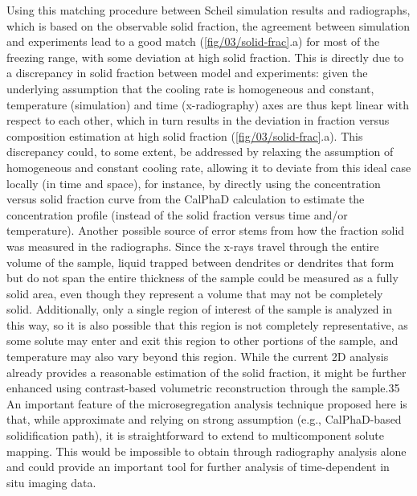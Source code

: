 Using this matching procedure between Scheil simulation results and
radiographs, which is based on the observable solid fraction, the
agreement between simulation and experiments lead to a good match
(\ref{fig/03/solid-frac}.a) for most of the freezing range, with some
deviation at high solid fraction.
This is directly due to a discrepancy in solid fraction between
model and experiments: given the underlying assumption that the cooling
rate is homogeneous and constant, temperature (simulation) and time
(x-radiography) axes are thus kept linear with respect to each other,
which in turn results in the deviation in fraction versus composition
estimation at high solid fraction (\ref{fig/03/solid-frac}.a).
This discrepancy could, to
some extent, be addressed by relaxing the assumption of homogeneous and
constant cooling rate, allowing it to deviate from this ideal case locally
(in time and space), for instance, by directly using the concentration
versus solid fraction curve from the CalPhaD calculation to estimate the
concentration profile (instead of the solid fraction versus time and/or
temperature). Another possible source of error stems from how the fraction
solid was measured in the radiographs. Since the x-rays travel through the
entire volume of the sample, liquid trapped between dendrites or dendrites
that form but do not span the entire thickness of the sample could be
measured as a fully solid area, even though they represent a volume that
may not be completely solid. Additionally, only a single region of
interest of the sample is analyzed in this way, so it is also possible
that this region is not completely representative, as some solute may
enter and exit this region to other portions of the sample, and
temperature may also vary beyond this region. While the current 2D
analysis already provides a reasonable estimation of the solid fraction,
it might be further enhanced using contrast-based volumetric
reconstruction through the sample.35 An important feature of the
microsegregation analysis technique proposed here is that, while
approximate and relying on strong assumption (e.g., CalPhaD-based
solidification path), it is straightforward to extend to multicomponent
solute mapping. This would be impossible to obtain through radiography
analysis alone and could provide an important tool for further analysis of
time-dependent in situ imaging data.

